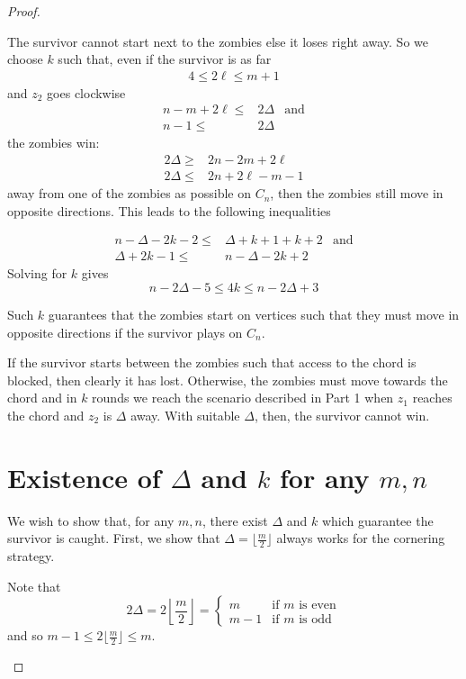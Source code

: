 \begin{proof}
\begin{proofpart}
  The survivor cannot start next to the zombies else it loses right away.
  So we choose $k$ such that, even if the survivor is as far  \begin{align*}
   4 \leq 2 \ell \leq m + 1
  \end{align*}
  and $z_2$ goes clockwise
  \begin{align*}
   n -m + 2\ell \leq & 2 \Delta & \text{and} \\
   n-1 \leq          & 2 \Delta
  \end{align*}
  the zombies win:
  \begin{align*}
   2 \Delta \geq & 2n - 2m + 2\ell    \\
   2 \Delta \leq & 2n + 2\ell - m - 1
  \end{align*}
  away from one of the zombies as possible on $C_n$, then the zombies
  still move in opposite directions. This leads to the following inequalities

  \begin{align*}
   n - \Delta - 2k - 2 \leq & \Delta + k +1 + k +2 & \text{and} \\
   \Delta + 2k -1 \leq      & n - \Delta -2k +2
  \end{align*}
  Solving for $k$ gives
  \[ n - 2\Delta -5 \leq 4k \leq n-2\Delta +3 \]

  Such $k$ guarantees that the zombies start on vertices such that they must
  move in opposite directions if the survivor plays on $C_n$.

  If the survivor starts between the zombies such that
  access to the chord is blocked, then clearly it has lost. Otherwise,
   the zombies must move towards the chord and in $k$ rounds we reach the
    scenario described in Part 1 when $z_1$ reaches the chord and $z_2$ is
    $\Delta$ away. With suitable $\Delta$, then, the survivor cannot win.
\end{proofpart}

\section{Existence of $\Delta$ and $k$ for any $m,n$ \label{thm q_m_n 3}}

\begin{proofpart}
We wish to show that, for any $m, n$, there exist $\Delta$ and $k$
which guarantee the survivor is caught.
First, we show that $\Delta = \lfloor \frac{m}{2} \rfloor$ always
works for the cornering strategy.

Note that
\[
2\Delta = 2 \left\lfloor \frac{m}{2} \right\rfloor =
\begin{cases}
m & \text{if $m$ is even} \\
m -1 & \text{if $m$ is odd}
\end{cases}
\]
and so $m -1 \leq 2 \lfloor \frac{m}{2} \rfloor \leq m$.


\end{proofpart}
\end{proof}
